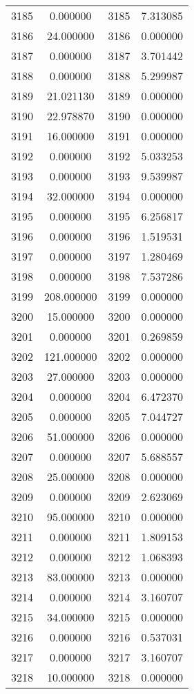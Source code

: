 \documentclass[12pt]{article}
\begin{document}
\begin{longtable}{@{}cccc@{}}
3185 & 0.000000 & 3185 & 7.313085 \\
3186 & 24.000000 & 3186 & 0.000000 \\
3187 & 0.000000 & 3187 & 3.701442 \\
3188 & 0.000000 & 3188 & 5.299987 \\
3189 & 21.021130 & 3189 & 0.000000 \\
3190 & 22.978870 & 3190 & 0.000000 \\
3191 & 16.000000 & 3191 & 0.000000 \\
3192 & 0.000000 & 3192 & 5.033253 \\
3193 & 0.000000 & 3193 & 9.539987 \\
3194 & 32.000000 & 3194 & 0.000000 \\
3195 & 0.000000 & 3195 & 6.256817 \\
3196 & 0.000000 & 3196 & 1.519531 \\
3197 & 0.000000 & 3197 & 1.280469 \\
3198 & 0.000000 & 3198 & 7.537286 \\
3199 & 208.000000 & 3199 & 0.000000 \\
3200 & 15.000000 & 3200 & 0.000000 \\
3201 & 0.000000 & 3201 & 0.269859 \\
3202 & 121.000000 & 3202 & 0.000000 \\
3203 & 27.000000 & 3203 & 0.000000 \\
3204 & 0.000000 & 3204 & 6.472370 \\
3205 & 0.000000 & 3205 & 7.044727 \\
3206 & 51.000000 & 3206 & 0.000000 \\
3207 & 0.000000 & 3207 & 5.688557 \\
3208 & 25.000000 & 3208 & 0.000000 \\
3209 & 0.000000 & 3209 & 2.623069 \\
3210 & 95.000000 & 3210 & 0.000000 \\
3211 & 0.000000 & 3211 & 1.809153 \\
3212 & 0.000000 & 3212 & 1.068393 \\
3213 & 83.000000 & 3213 & 0.000000 \\
3214 & 0.000000 & 3214 & 3.160707 \\
3215 & 34.000000 & 3215 & 0.000000 \\
3216 & 0.000000 & 3216 & 0.537031 \\
3217 & 0.000000 & 3217 & 3.160707 \\
3218 & 10.000000 & 3218 & 0.000000 \\

\end{longtable}
\end{document}
